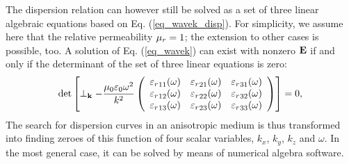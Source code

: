 The dispersion relation can however still be solved \cite[pp. 667]{born1999book} as a set of three linear algebraic equations based on Eq. (\ref{eq_wavek_disp}).
For simplicity, we assume here that the relative permeability $\mu_r = 1$; the extension to other cases is possible, too. %
A solution of Eq. (\ref{eq_wavek}) can exist with nonzero $\mathbf{E}$ if and only if the determinant of the set of three linear equations is zero:
\begin{equation} 
\det\left[
\perp_{\mathbf{k}} -
	\frac{\mu_0 \varepsilon_0 \omega^2}{k^2}
	\left(\begin{array}{ccc} 
	{\varepsilon_r}_{11}(\omega) & {\varepsilon_r}_{21}(\omega) & {\varepsilon_r}_{31}(\omega)  \\
	{\varepsilon_r}_{12}(\omega) & {\varepsilon_r}_{22}(\omega) & {\varepsilon_r}_{32}(\omega)  \\
	{\varepsilon_r}_{13}(\omega) & {\varepsilon_r}_{23}(\omega) & {\varepsilon_r}_{33}(\omega)  
	\end{array} \right) \right] = 0, \label{eq_dispdet}\end{equation}
The search for dispersion curves in an anisotropic medium is thus transformed into finding zeroes of this function of four scalar variables, $k_x$, $k_y$, $k_z$ and $\omega$.
In the most general case, it can be solved by means of numerical algebra software. 

